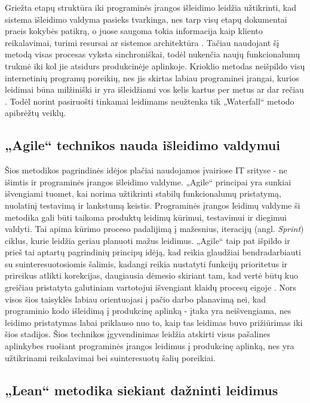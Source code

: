 \documentclass{VUMIFPSkursinis}
\begin{document}
Griežta etapų struktūra iki programinės įrangos išleidimo leidžia užtikrinti, kad sistema išleidimo valdyma pasieks tvarkinga, nes tarp visų etapų dokumentai praeis kokybės patikrą, o juose saugoma tokia informacija kaip kliento reikalavimai, turimi resursai ar sistemos architektūra \cite{SaltKetvirtas}. Tačiau naudojant šį metodą visas procesas vyksta sinchroniškai, todėl nukenčia naujų funkcionalumų trukmė iki kol jie atsidurs produkcinėje aplinkoje. Krioklio metodas neišpildo visų internetinių programų poreikių, nes jis skirtas labiau programinei įrangai, kurios leidimai būna milžiniški ir yra išleidžiami vos kelis kartus per metus ar dar rečiau \cite{SaltTrecias}. Todėl norint pasiruošti tinkamai leidimams neužtenka tik „Waterfall“ metodo apibrėžtų veiklų.

\subsection{„Agile“ technikos nauda išleidimo valdymui}

Šios metodikos pagrindinės idėjos plačiai naudojamos įvairiose IT srityse - ne išimtis ir programinės įrangos išleidimo valdyme. „Agile“ principai yra sunkiai išvengiami tuomet, kai norima užtikrinti stabilų funkcionalumų pristatymą, nuolatinį testavimą ir lankstumą keistis. Programinės įrangos leidimų valdyme ši metodika gali būti taikoma produktų leidimų kūrimui, testavimui ir diegimui valdyti. Tai apima kūrimo proceso padalijimą į mažesnius, iteracijų (angl. \textit{Sprint}) ciklus, kurie leidžia geriau planuoti mažus leidimus. „Agile“ taip pat išpildo ir prieš tai aptartų pagrindinių principų idėją, kad reikia glaudžiai bendradarbiauti su suinteresuotosiomis šalimis, kadangi reikia nustatyti funkcijų prioritetus ir prireikus atlikti korekcijas, daugiausia dėmesio skiriant tam, kad vertė būtų kuo greičiau pristatyta galutiniam vartotojui išvengiant klaidų procesų eigoje \cite{SaltTrecias}. Nors visos šios taisyklės labiau orientuojasi į pačio darbo planavimą nei, kad programinio kodo išleidimą į produkcinę aplinką - įtaka yra neišvengiama, nes leidimo pristatymas labai priklauso nuo to, kaip tas leidimas buvo prižiūrimas iki šios stadijos. Šios technikos įgyvendinimas leidžia atskirti visus pašalines aplinkybes ruošiant programinės įrangos leidimus į produkcinę aplinką, nes yra užtikrinami reikalavimai bei suinteresuotų šalių poreikiai.

\subsection{„Lean“ metodika siekiant dažninti leidimus}
\end{document}
